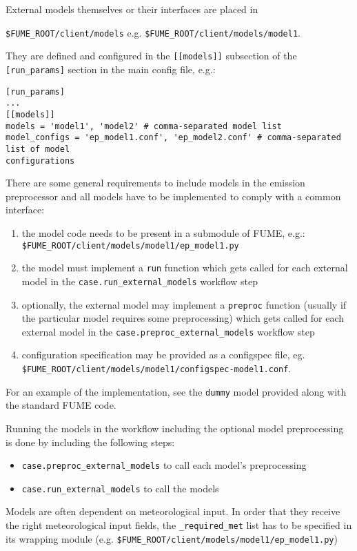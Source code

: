\documentclass[a4paper,11pt]{article}
\begin{document}
External models themselves or their interfaces are placed in

\verb|$FUME_ROOT/client/models| e.g. \verb|$FUME_ROOT/client/models/model1|.

They are defined and configured in the \verb|[[models]]| subsection of the
\verb|[run_params]| section in the main config file, e.g.:
\begin{verbatim}
[run_params]
...
[[models]]
models = 'model1', 'model2' # comma-separated model list
model_configs = 'ep_model1.conf', 'ep_model2.conf' # comma-separated list of model
configurations
\end{verbatim}

There are some general requirements to include models in the emission
preprocessor and all models have to be implemented to comply with a common interface:
\begin{enumerate}
\item the model code needs to be present in a submodule of FUME, e.g.:\\
\verb|$FUME_ROOT/client/models/model1/ep_model1.py| 
\item the model must implement a \verb|run| function which gets called for each external model in the \verb|case.run_external_models| workflow step
\item optionally, the external model may implement a \verb|preproc| function (usually if the particular model requires some preprocessing) which gets called for each external model in the \verb|case.preproc_external_models| workflow step
\item configuration specification may be provided as a configspec file, eg.\\
\verb|$FUME_ROOT/client/models/model1/configspec-model1.conf|. 
    
\end{enumerate}
For an example of the implementation, see the \verb|dummy| model provided along with the standard FUME code.

Running the models in the workflow including the optional model
preprocessing is done by including the following steps:
\begin{itemize}
\item \verb|case.preproc_external_models| to call each model's preprocessing
\item \verb|case.run_external_models| to call the models
\end{itemize}

Models are often dependent on meteorological input. In order that they
receive the right meteorological input fields, the \verb|_required_met| list
has to be specified in its wrapping module (e.g. \verb|$FUME_ROOT/client/models/model1/ep_model1.py|)
\end{document}
